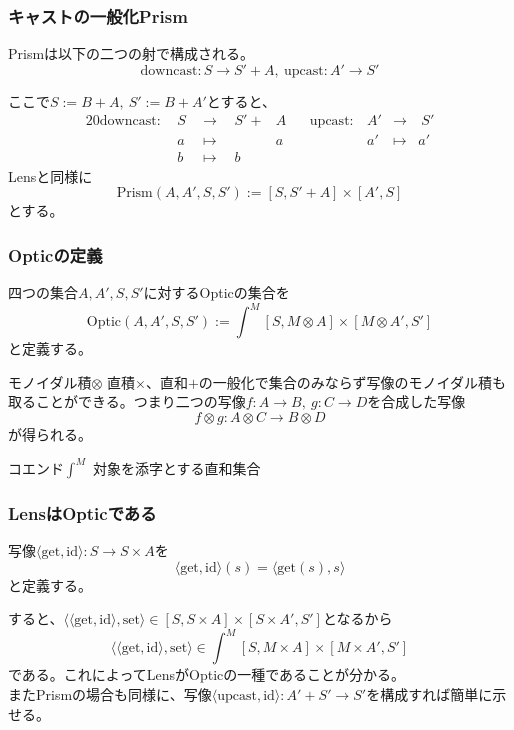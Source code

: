 \documentclass[uplatex,dvipdfmx]{beamer}
\newcommand{\arrow}{\rightarrow}
\newcommand{\tuple}[1]{\langle #1\rangle}
\newcommand{\mor}[3]{#1:#2\arrow #3}
\newcommand{\inset}[2]{[#1,#2]}
\newenvironment{mydescription}
{\begin{description}
  \setlength{\parskip}{0.5cm}
}
{\end{description}}
\begin{document}
  \begin{frame}\frametitle{キャストの一般化Prism}
    \begin{definition}[Prism]
      Prismは以下の二つの射で構成される。
      \[\mor{\mathrm{downcast}}{S}{S' + A},\ \mor{\mathrm{upcast}}{A'}{S'}\]
    \end{definition}
    ここで$S:=B+ A,\ S':=B+ A'$とすると、
    \begin{alignat*}{20}
      \mathrm{downcast}:\ &S\ \ &\longrightarrow \ \ &S'+&A & \ \ \ \ \mathrm{upcast}: &A'&\longrightarrow &\ S'\\
      &a \ \ &\longmapsto \ \ &&a &&a'&\longmapsto &a'\\
      &b \ \ &\longmapsto \ \ &b& &
    \end{alignat*}
    Lensと同様に\[\mathrm{Prism}(A,A',S,S') := \inset{S}{S'+A}\times\inset{A'}{S}\]とする。
  \end{frame}
  \begin{frame}\frametitle{Opticの定義}
    \begin{definition}[Optic]
      四つの集合$A,A',S,S'$に対するOpticの集合を\[\mathrm{Optic}(A,A',S,S') := \int^M \inset{S}{M\otimes A}\times \inset{M\otimes A'}{S'}\]と定義する。
    \end{definition}
    \begin{mydescription}
      \item[モノイダル積$\otimes$] 直積$\times$、直和$+$の一般化で集合のみならず写像のモノイダル積も取ることができる。つまり二つの写像$\mor{f}{A}{B},\ \mor{g}{C}{D}$を合成した写像
      \[\mor{f\otimes g}{A\otimes C}{B\otimes D}\]が得られる。
      \item[コエンド$\int^M$] 対象を添字とする直和集合
    \end{mydescription}
  \end{frame}
  \begin{frame}\frametitle{LensはOpticである}
    写像$\tuple{\mathrm{get},\mathrm{id}}\mor{}{S}{S\times A}$を\[\tuple{\mathrm{get},\mathrm{id}}(s)=\tuple{\mathrm{get}(s),s}\]と定義する。

    すると、$\tuple{\tuple{\mathrm{get},\mathrm{id}},\mathrm{set}}\in \inset{S}{S\times A}\times \inset{S\times A'}{S'}$となるから\[\tuple{\tuple{\mathrm{get},\mathrm{id}},\mathrm{set}}\in \int^{M}\inset{S}{M\times A}\times \inset{M\times A'}{S'}\]である。これによってLensがOpticの一種であることが分かる。\\
    \vspace{\baselineskip}
    またPrismの場合も同様に、写像$\mor{\tuple{\mathrm{\mathrm{upcast},id}}}{A'+S'}{S'}$を構成すれば簡単に示せる。
  \end{frame}
\end{document}
